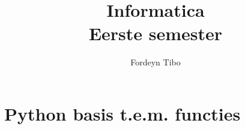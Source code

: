 \documentclass{report}
\title{\Huge{Informatica}\\Eerste semester}
\author{\huge{Fordeyn Tibo}}
\date{}
\begin{document}
\maketitle


\newpage%
\tableofcontents
\pagebreak

\chapter{Python basis t.e.m. functies}
\section{}
\end{document}
